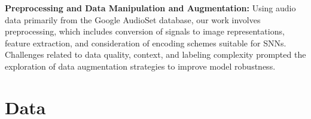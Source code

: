 \documentclass[11pt]{article}
\begin{document}
\textbf{Preprocessing and Data Manipulation and Augmentation:} Using audio data primarily from the Google AudioSet database, our work involves preprocessing, which includes conversion of signals to image representations, feature extraction, and consideration of encoding schemes suitable for SNNs. Challenges related to data quality, context, and labeling complexity prompted the exploration of data augmentation strategies to improve model robustness.

\section{Data}



\pagebreak

%
%
\end{document}
